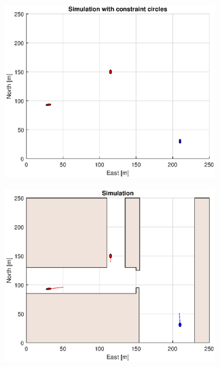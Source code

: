 \clearpage
\begin{figure}[!b] %
    \begin{subfigure}[b]{0.49\textwidth}
        \centering
        \includegraphics[width=\textwidth]{Images/Figures/Havn1/Simple0_f1_Frame1}
    \end{subfigure}
    \hfill
    \begin{subfigure}[b]{0.499\textwidth}
        \centering
        \includegraphics[width=\textwidth]{Images/Figures/Havn1/Simple0_f600_Frame1}

\end{subfigure}
\end{figure}

